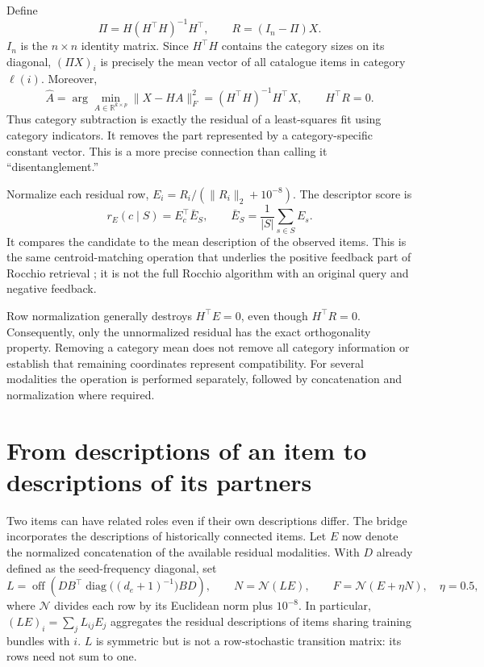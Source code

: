 \documentclass[11pt,a4paper]{article}
\newcommand{\diag}{\operatorname{diag}}
\newcommand{\off}{\operatorname{off}}
\begin{document}
Define
\begin{equation}
 \Pi=H(H^\top H)^{-1}H^\top,\qquad R=(I_n-\Pi)X.
\end{equation}
$I_n$ is the $n\times n$ identity matrix. Since $H^\top H$ contains the
category sizes on its diagonal, $(\Pi X)_i$ is precisely the mean vector
of all catalogue items in category $\ell(i)$.
Moreover,
\[
 \widehat A=\arg\min_{A\in\mathbb R^{k\times p}}\|X-HA\|_F^2
           =(H^\top H)^{-1}H^\top X,\qquad H^\top R=0.
\]
Thus category subtraction is exactly the residual of a least-squares fit using
category indicators. It removes the part represented by a category-specific
constant vector. This is a more precise connection than calling it
``disentanglement.''

Normalize each residual row, $E_i=R_i/(\|R_i\|_2+10^{-8})$. The descriptor
score is
\[
 r_E(c\mid S)=E_c^\top\bar E_S,\qquad
 \bar E_S=\frac1{|S|}\sum_{s\in S}E_s.
\]
It compares the candidate to the mean description of the observed items.
This is the same centroid-matching operation that underlies the positive
feedback part of Rocchio retrieval \cite{rocchio}; it is not the full Rocchio
algorithm with an original query and negative feedback.

Row normalization generally destroys $H^\top E=0$, even though $H^\top R=0$.
Consequently, only the unnormalized residual has the exact orthogonality
property. Removing a category mean does not remove all category information
or establish that remaining coordinates represent compatibility.
For several modalities the operation is performed separately, followed by
concatenation and normalization where required.

\section{From descriptions of an item to descriptions of its partners}
Two items can have related roles even if their own descriptions differ.
The bridge incorporates the descriptions of historically connected items.
Let $E$ now denote the normalized concatenation of the available residual
modalities. With $D$ already defined as the seed-frequency diagonal, set
\[
 L=\off\!\left(D B^\top
       \diag\bigl((d_e+1)^{-1}\bigr) B D\right),\qquad
 N=\mathcal N(LE),\qquad F=\mathcal N(E+\eta N),\quad\eta=0.5,
\]
where $\mathcal N$ divides each row by its Euclidean norm plus $10^{-8}$.
In particular, $(LE)_i=\sum_jL_{ij}E_j$ aggregates the residual descriptions
of items sharing training bundles with $i$. $L$ is symmetric but is not a
row-stochastic transition matrix: its rows need not sum to one.
\end{document}

